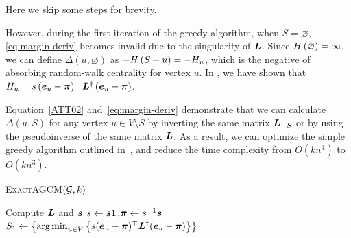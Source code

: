 \documentclass[journal]{IEEEtran}
\begin{document}
Here we skip some steps for brevity.

However, during the first iteration of the greedy algorithm, when \(S=\varnothing\), \eqref{eq:margin-deriv} becomes invalid due to the singularity of \(\boldsymbol{L}\).
Since \(H\left(\varnothing\right)=\infty\), we can define \(\Delta(u,\varnothing)\) as \(-H\left(S+u\right)=-H_u\), which is the negative of absorbing random-walk centrality for vertex \(u\).
In , we have shown that \(H_u=s\left( \boldsymbol{e}_u-\boldsymbol{\pi} \right)^\top\boldsymbol{L}^{\dagger}\left( \boldsymbol{e}_u-\boldsymbol{\pi} \right)\).

Equation~\eqref{ATT02} and~\eqref{eq:margin-deriv} demonstrate that we can calculate \(\Delta(u,S)\) for any vertex \(u\in V\setminus S\) by inverting the same matrix \(\boldsymbol{L}_{-S}\) or by using the pseudoinverse of the same matrix \(\boldsymbol{L}\).
As a result, we can optimize the simple greedy algorithm outlined in~, and reduce the time complexity from \(O(kn^4)\) to \(O(kn^3)\).

\begin{algorithm}
    \caption{\textsc{ExactAGCM}\((\mathcal{G},k)\)}
    \label{algo:exact}
    Compute \(\boldsymbol{L}\) and \(\boldsymbol{s}\)\;
    \(s\gets\boldsymbol{s}\boldsymbol{1}\),\(\boldsymbol{\pi}\gets {s}^{-1}\boldsymbol{s}\)\;
    \(S_1\gets\left\{\operatorname*{arg\,min}_{u\in V}\left\{s(\boldsymbol{e}_u-\boldsymbol{\pi})^\top\boldsymbol{L}^\dagger(\boldsymbol{e}_u-\boldsymbol{\pi}) \right\} \right\}\)\;
\end{algorithm}
\end{document}
